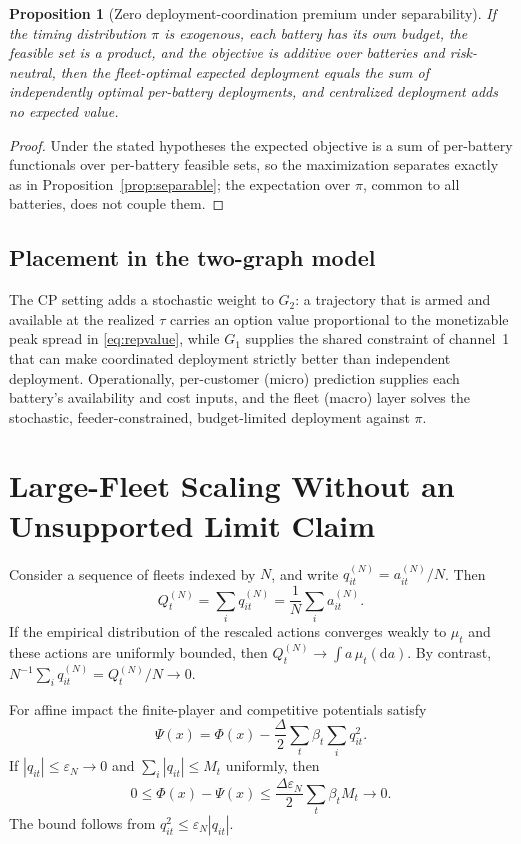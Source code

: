 \documentclass[11pt]{article}
\newtheorem{proposition}[assumption]{Proposition}
\theoremstyle{remark}
\newcommand{\dd}{\mathrm d}
\begin{document}
\begin{proposition}[Zero deployment-coordination premium under separability]
\label{prop:cpseparable}
If the timing distribution $\pi$ is exogenous, each battery has its own
budget, the feasible set is a product, and the objective is additive over
batteries and risk-neutral, then the fleet-optimal expected deployment equals
the sum of independently optimal per-battery deployments, and centralized
deployment adds no expected value.
\end{proposition}
\begin{proof}
Under the stated hypotheses the expected objective is a sum of per-battery
functionals over per-battery feasible sets, so the maximization separates
exactly as in Proposition~\ref{prop:separable}; the expectation over $\pi$,
common to all batteries, does not couple them.
\end{proof}


\subsection{Placement in the two-graph model}
The CP setting adds a stochastic weight to $G_2$: a trajectory that is armed
and available at the realized $\tau$ carries an option value proportional to
the monetizable peak spread in \eqref{eq:repvalue}, while $G_1$ supplies the
shared constraint of channel~1 that can make coordinated deployment strictly
better than independent deployment. Operationally, per-customer (micro) prediction
supplies each battery's availability and cost inputs, and the fleet (macro)
layer solves the stochastic, feeder-constrained, budget-limited deployment
against $\pi$.

\section{Large-Fleet Scaling Without an Unsupported Limit Claim}
\label{sec:limit}

Consider a sequence of fleets indexed by $N$, and write
$q_{it}^{(N)}=a_{it}^{(N)}/N$. Then
\begin{equation}
 Q_t^{(N)}=\sum_iq_{it}^{(N)}
           =\frac1N\sum_i a_{it}^{(N)}.
 \label{eq:scaling}
\end{equation}
If the empirical distribution of the rescaled actions converges weakly to
$\mu_t$ and these actions are uniformly bounded, then
$Q_t^{(N)}\to\int a\,\mu_t(\dd a)$. By contrast,
$N^{-1}\sum_iq_{it}^{(N)}=Q_t^{(N)}/N\to0$.


For affine impact the finite-player and competitive potentials satisfy
\begin{equation}
 \Psi(x)=\Phi(x)-\frac{\Delta}{2}\sum_t\beta_t\sum_iq_{it}^2.
 \label{eq:limitpotential}
\end{equation}
If $|q_{it}|\le\varepsilon_N\to0$ and
$\sum_i|q_{it}|\le M_t$ uniformly, then
\begin{equation}
 0\le\Phi(x)-\Psi(x)
 \le\frac{\Delta\varepsilon_N}{2}\sum_t\beta_tM_t\longrightarrow0.
 \label{eq:uniformbound}
\end{equation}
The bound follows from $q_{it}^2\le\varepsilon_N|q_{it}|$. 
\end{document}
